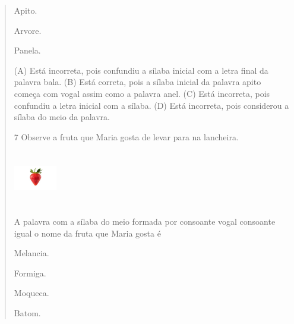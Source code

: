 \begin{verse}
\begin{minipage}{.5\textwidth}
\begin{escolha}
\item Apito.

\item Arvore.

\item Panela.
\end{escolha}
\end{minipage}

(A) Está incorreta, pois confundiu a sílaba inicial com a letra final da palavra bala.
(B) Está correta, pois a sílaba inicial da palavra apito começa com
vogal assim como a palavra anel.
(C) Está incorreta, pois confundiu a letra inicial com a sílaba.
(D) Está incorreta, pois considerou a sílaba do meio da palavra.

\num{7} Observe a fruta que Maria gosta de levar para na lancheira.

\includegraphics[width=0.73819in,height=0.93750in]{media/image152.jpeg}


A palavra com a sílaba do meio formada por consoante vogal consoante igual o nome da fruta que Maria gosta é

\begin{minipage}{.5\textwidth}
\begin{escolha}
\item Melancia.

\item Formiga.

\item Moqueca.

\item Batom.
\end{escolha}
\end{minipage}


\end{verse}
